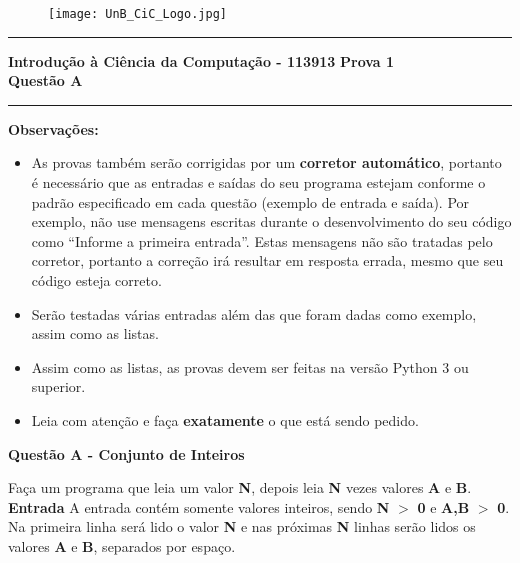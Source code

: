 \documentclass[a4paper, 12pt]{article}
\begin{document}
\begin{figure}[H]
	\texttt{[image: UnB\_CiC\_Logo.jpg]}
\end{figure}
\noindent\rule{\textwidth}{0.4pt}
\begin{center}
	\textbf{{\Large Introdução à Ciência da Computação - 113913}} \newline \newline
	\textbf{{\large Prova 1} \\
	\vspace{9pt}
	{\large Questão A}} \\
	\noindent\rule{\textwidth}{0.4pt}
	\newline
\end{center}

\textbf{{\large Observações:}}
\begin{itemize}
	\item As provas também serão corrigidas por um \textbf{corretor automático}, portanto é necessário que as entradas e saídas do seu programa estejam conforme o padrão especificado em cada questão (exemplo de entrada e saída). Por exemplo, não use mensagens escritas durante o desenvolvimento do seu código como “Informe a primeira entrada”. Estas mensagens não são tratadas pelo corretor, portanto a correção irá resultar em resposta errada, mesmo que seu código esteja correto.
	\item Serão testadas várias entradas além das que foram dadas como exemplo, assim como as listas.
	\item Assim como as listas, as provas devem ser feitas na versão Python 3 ou superior.
	\item Leia com atenção e faça \textbf{exatamente} o que está sendo pedido.
\end{itemize}
\newpage %
\begin{center}
\textbf{{\Large Questão A - Conjunto de Inteiros}}
\end{center}
\vspace{5pt}
Faça um programa que leia um valor \textbf{N}, depois leia \textbf{N} vezes valores \textbf{A} e \textbf{B}.
\newline \newline
\textbf{{\large Entrada}} \newline
A entrada contém somente valores inteiros, sendo \textbf{N} $>$ \textbf{0} e \textbf{A,B} $>$ \textbf{0}. Na primeira linha será lido o valor \textbf{N} e nas próximas \textbf{N} linhas serão lidos os valores \textbf{A} e \textbf{B}, separados por espaço.
\newline \newline
\end{document}
